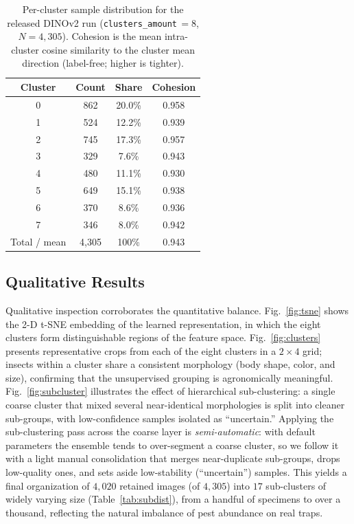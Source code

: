 \documentclass[10pt,a4paper,twocolumn]{article}
\begin{document}
\begin{table}[t]
\centering
\caption{Per-cluster sample distribution for the released DINOv2 run (\texttt{clusters\_amount}\,$=\!8$, $N\!=\!4{,}305$). Cohesion is the mean intra-cluster cosine similarity to the cluster mean direction (label-free; higher is tighter).}
\label{tab:dist}
\small
\begin{tabular}{@{}cccc@{}}
\toprule
Cluster & Count & Share & Cohesion \\
\midrule
0       & 862   & 20.0\% & 0.958 \\
1       & 524   & 12.2\% & 0.939 \\
2       & 745   & 17.3\% & 0.957 \\
3       & 329   &  7.6\% & 0.943 \\
4       & 480   & 11.1\% & 0.930 \\
5       & 649   & 15.1\% & 0.938 \\
6       & 370   &  8.6\% & 0.936 \\
7       & 346   &  8.0\% & 0.942 \\
\midrule
Total / mean & 4{,}305 & 100\% & 0.943 \\
\bottomrule
\end{tabular}
\end{table}

\subsection{Qualitative Results}
Qualitative inspection corroborates the quantitative balance. Fig.~\ref{fig:tsne} shows the 2-D t-SNE embedding of the learned representation, in which the eight clusters form distinguishable regions of the feature space. Fig.~\ref{fig:clusters} presents representative crops from each of the eight clusters in a $2\!\times\!4$ grid; insects within a cluster share a consistent morphology (body shape, color, and size), confirming that the unsupervised grouping is agronomically meaningful. Fig.~\ref{fig:subcluster} illustrates the effect of hierarchical sub-clustering: a single coarse cluster that mixed several near-identical morphologies is split into cleaner sub-groups, with low-confidence samples isolated as ``uncertain.'' Applying the sub-clustering pass across the coarse layer is \emph{semi-automatic}: with default parameters the ensemble tends to over-segment a coarse cluster, so we follow it with a light manual consolidation that merges near-duplicate sub-groups, drops low-quality ones, and sets aside low-stability (``uncertain'') samples. This yields a final organization of $4{,}020$ retained images (of $4{,}305$) into $17$ sub-clusters of widely varying size (Table~\ref{tab:subdist}), from a handful of specimens to over a thousand, reflecting the natural imbalance of pest abundance on real traps.
\end{document}
